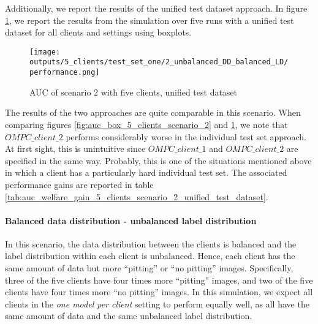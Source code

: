 Additionally, we report the results of the unified test dataset approach. In figure \ref{fig:auc_box_5_clients_scenario_2_uni}, we report the results from the simulation over five runs with a unified test dataset for all clients and settings using boxplots.
\begin{figure}[htb!]
    \centering
    \texttt{[image: outputs/5\_clients/test\_set\_one/2\_unbalanced\_DD\_balanced\_LD/performance.png]}
    \caption{AUC of scenario 2 with five clients, unified test dataset}
    \label{fig:auc_box_5_clients_scenario_2_uni}
\end{figure}
The results of the two approaches are quite comparable in this scenario. When comparing figures \ref{fig:auc_box_5_clients_scenario_2} and \ref{fig:auc_box_5_clients_scenario_2_uni}, we note that $OMPC\_client\_2$ performs considerably worse in the individual test set approach. At first sight, this is unintuitive since $OMPC\_client\_1$ and $OMPC\_client\_2$ are specified in the same way. Probably, this is one of the situations mentioned above in which a client has a particularly hard individual test set.
The associated performance gains are reported in table \ref{tab:auc_welfare_gain_5_clients_scenario_2_unified_test_dataset}.


\paragraph*{Balanced data distribution - unbalanced label distribution} In this scenario, the data distribution between the clients is balanced and the label distribution within each client is unbalanced. Hence, each client has the same amount of data but more ``pitting'' or ``no pitting'' images. Specifically, three of the five clients have four times more ``pitting'' images, and two of the five clients have four times more ``no pitting'' images. In this simulation, we expect all clients in the \emph{one model per client} setting to perform equally well, as all have the same amount of data and the same unbalanced label distribution.

